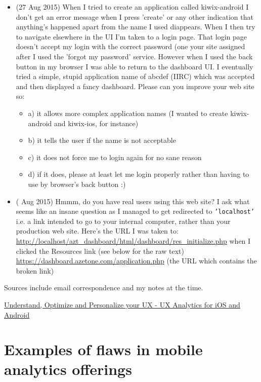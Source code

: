 \begin{itemize}
    \item (27 Aug 2015) When I tried to create an application called kiwix-android I don't get an error message when I press 'create' or any other indication that anything's happened apart from the name I used diappears. When I then try to navigate elsewhere in the UI I'm taken to a login page. That login page doesn't accept my login with the correct password (one your site assigned after I used the 'forgot my password' service. However when I used the back button in my browser I was able to return to the dashboard UI. I eventually tried a simple, stupid application name of abcdef (IIRC) which was accepted and then displayed a fancy dashboard. Please can you improve your web site so:
    \begin{itemize}
        \item a) it allows more complex application names (I wanted to create kiwix-android and kiwix-ios, for instance)
        \item b) it tells the user if the name is not acceptable
        \item c) it does not force me to login again for no sane reason
        \item d) if it does, please at least let me login properly rather than having to use by browser's back button :)
    \end{itemize}
    \item ( Aug 2015) Hmmm, do you have real users using this web site? I ask what seems like an insane question as I managed to get redirected to \texttt{'localhost'} i.e. a link intended to go to your internal computer, rather than your production web site. Here's the URL I was taken to: \url{http://localhost/azt\_dashboard/html/dashboard/res\_initialize.php} when I clicked the Resources link (see below for the raw text)  \url{https://dashboard.azetone.com/application.php} (the URL which contains the broken link)

\end{itemize}
Sources include email correspondence and my notes at the time.

\href{https://www.azetone.com/mobile-ux-analytics/}{Understand, Optimize and Personalize your UX - UX Analytics for iOS and Android}

\section{Examples of flaws in mobile analytics offerings}
